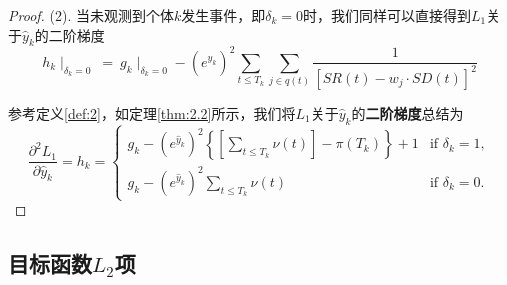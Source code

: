 \begin{proof}
(2). 当未观测到个体$k$发生事件，即$\delta_k=0$时，我们同样可以直接得到$L_1$关于$\hat{y}_k$的二阶梯度$$
h_k\mid_{\delta_k=0}\ =\ g_k\mid_{\delta_k=0} - (e^{\hat{y}_k})^2 \sum_{t\le T_k} \sum_{j\in q(t)} \frac{1}{[SR(t) - w_j\cdot SD(t)]^2}
$$

参考定义\ref{def:2}，如定理\ref{thm:2.2}所示，我们将$L_1$关于$\hat{y}_k$的\textbf{二阶梯度}总结为$$
\frac{\partial^2 L_1}{\partial \hat{y}_k} = h_k = 
\begin{cases}
g_k - (e^{\hat{y}_k})^2 \left\{ \left[\sum_{t\le T_k} \nu(t)\right] - \pi(T_k) \right\} + 1 & \text{if } \delta_k = 1,\\
g_k - (e^{\hat{y}_k})^2 \sum_{t\le T_k} \nu(t) & \text{if } \delta_k = 0.
\end{cases}
$$
\end{proof}

\subsection{目标函数$L_2$项}

